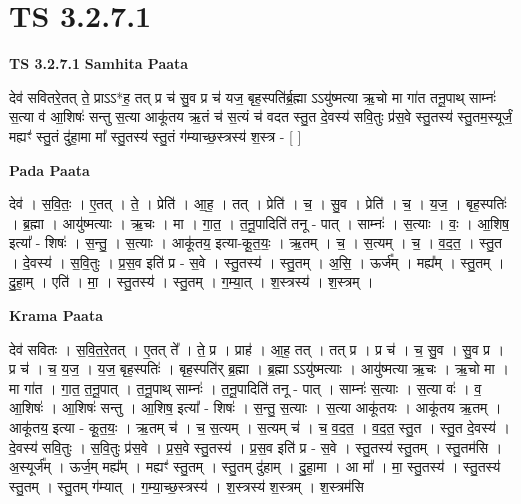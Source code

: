 \documentclass[17pt]{extarticle}
\begin{document}

\section{ TS 3.2.7.1 }

\textbf{TS 3.2.7.1 } \newline
\textbf{Samhita Paata} \newline

देव॑ सवितरे॒तत् ते॒ प्राऽऽ*ह॒ तत् प्र च॑ सु॒व प्र च॑ यज॒ बृह॒स्पति॑र्ब्र॒ह्मा ऽऽयु॑ष्मत्या ऋ॒चो मा गा॑त तनू॒पाथ् साम्नः॑ स॒त्या व॑ आ॒शिषः॑ सन्तु स॒त्या आकू॑तय ऋ॒तं च॑ स॒त्यं च॑ वदत स्तु॒त दे॒वस्य॑ सवि॒तुः प्र॑स॒वे स्तु॒तस्य॑ स्तु॒तम॒स्यूर्जं॒ मह्यꣳ॑ स्तु॒तं दु॑हा॒मा मा᳚ स्तु॒तस्य॑ स्तु॒तं ग॑म्याच्छ॒स्त्रस्य॑ श॒स्त्र - [  ] \newline

\textbf{Pada Paata} \newline

देव॑ । स॒वि॒तः॒ । ए॒तत् । ते॒ । प्रेति॑ । आ॒ह॒ । तत् । प्रेति॑ । च॒ । सु॒व । प्रेति॑ । च॒ । य॒ज॒ । बृह॒स्पतिः॑ । ब्र॒ह्मा । आयु॑ष्मत्याः । ऋ॒चः । मा । गा॒त॒ । त॒नू॒पादिति॑ तनू - पात् । साम्नः॑ । स॒त्याः । वः॒ । आ॒शिष॒ इत्या᳚ - शिषः॑ । स॒न्तु॒ । स॒त्याः । आकू॑तय॒ इत्या-कू॒त॒यः॒ । ऋ॒तम् । च॒ । स॒त्यम् । च॒ । व॒द॒त॒ । स्तु॒त । दे॒वस्य॑ । स॒वि॒तुः । प्र॒स॒व इति॑ प्र - स॒वे । स्तु॒तस्य॑ । स्तु॒तम् । अ॒सि॒ । ऊर्ज᳚म् । मह्य᳚म् । स्तु॒तम् । दु॒हा॒म् । एति॑ । मा॒ । स्तु॒तस्य॑ । स्तु॒तम् । ग॒म्या॒त् । श॒स्त्रस्य॑ । श॒स्त्रम् ।  \newline


\textbf{Krama Paata} \newline

देव॑ सवितः । स॒वि॒त॒रे॒तत् । ए॒तत् ते᳚ । ते॒ प्र । प्राह॑ । आ॒ह॒ तत् । तत् प्र । प्र च॑ । च॒ सु॒व । सु॒व प्र । प्र च॑ । च॒ य॒ज॒ । य॒ज॒ बृह॒स्पतिः॑ । बृह॒स्पति॑र् ब्र॒ह्मा । ब्र॒ह्मा ऽऽयु॑ष्मत्याः । आयु॑ष्मत्या ऋ॒चः । ऋ॒चो मा । मा गा॑त । गा॒त॒ त॒नू॒पात् । त॒नू॒पाथ् साम्नः॑ । त॒नू॒पादिति॑ तनू - पात् । साम्नः॑ स॒त्याः । स॒त्या वः॑ । व॒ आ॒शिषः॑ । आ॒शिषः॑ सन्तु । आ॒शिष॒ इत्या᳚ - शिषः॑ । स॒न्तु॒ स॒त्याः । स॒त्या आकू॑तयः । आकू॑तय ऋ॒तम् । आकू॑तय॒ इत्या - कू॒त॒यः॒ । ऋ॒तम् च॑ । च॒ स॒त्यम् । स॒त्यम् च॑ । च॒ व॒द॒त॒ । व॒द॒त॒ स्तु॒त । स्तु॒त दे॒वस्य॑ । दे॒वस्य॑ सवि॒तुः । स॒वि॒तुः प्र॑स॒वे । प्र॒स॒वे स्तु॒तस्य॑ । प्र॒स॒व इति॑ प्र - स॒वे । स्तु॒तस्य॑ स्तु॒तम् । स्तु॒तम॑सि । अ॒स्यूर्ज᳚म् । ऊर्ज॒म् मह्य᳚म् । मह्यꣳ॑ स्तु॒तम् । स्तु॒तम् दु॑हाम् । दु॒हा॒मा । आ मा᳚ । मा॒ स्तु॒तस्य॑ । स्तु॒तस्य॑ स्तु॒तम् । स्तु॒तम् ग॑म्यात् । ग॒म्या॒च्छ॒स्त्रस्य॑ । श॒स्त्रस्य॑ श॒स्त्रम् । श॒स्त्रम॑सि \newline
\end{document}
